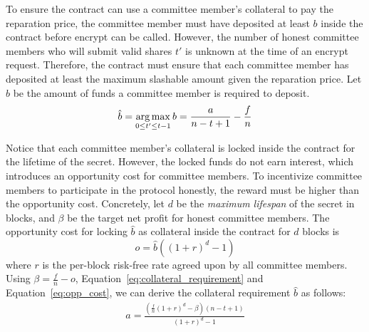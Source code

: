 To ensure the contract can use a committee member's collateral to pay the reparation price, the committee member must have deposited at least $b$ inside the contract before \textsf{encrypt} can be called.
However, the number of honest committee members who will submit valid shares $t'$ is unknown at the time of an \textsf{encrypt} request.
Therefore, the contract must ensure that each committee member has deposited at least the maximum slashable amount given the reparation price.
Let $\hat{b}$ be the amount of funds a committee member is required to deposit.
\begin{equation}\label{eq:collateral_requirement}
    \hat{b} = \operatorname*{arg\,max}_{0 \leq t' \leq t - 1} b = \frac{a}{n - t + 1} - \frac{f}{n}
\end{equation}

Notice that each committee member's collateral is locked inside the contract for the lifetime of the secret.
However, the locked funds do not earn interest, which introduces an opportunity cost for committee members.
To incentivize committee members to participate in the protocol honestly, the reward must be higher than the opportunity cost.
Concretely, let $d$ be the \emph{maximum lifespan} of the secret in blocks, and $\beta$ be the target net profit for honest committee members.
The opportunity cost for locking $\hat{b}$ as collateral inside the contract for $d$ blocks is
\begin{equation}\label{eq:opp_cost}
    o = \hat{b}((1 + r)^d - 1)
\end{equation}
where $r$ is the per-block risk-free rate agreed upon by all committee members.
Using $\beta = \frac{f}{n} - o$, Equation~\ref{eq:collateral_requirement} and Equation~\ref{eq:opp_cost}, we can derive the collateral requirement $\hat{b}$ as follows:
\begin{gather}\label{eq:collateral_from_holding_fee}
    a = \frac{(\frac{f}{n}(1 + r)^d - \beta)(n - t + 1)}{(1 + r)^d - 1}
\end{gather}


